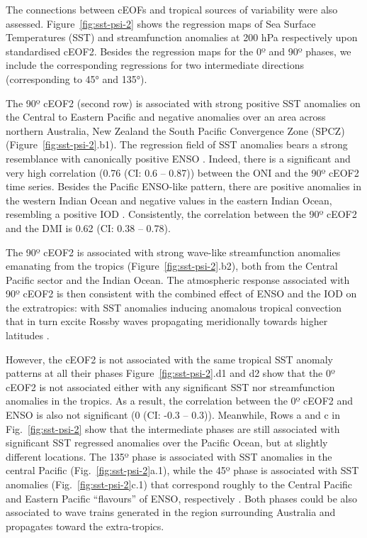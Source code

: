 \documentclass[pdflatex,sn-basic]{sn-jnl}
\theoremstyle{thmstyleone}%
\theoremstyle{thmstyletwo}%
\theoremstyle{thmstylethree}%
\begin{document}
The connections between cEOFs and tropical sources of variability were also assessed.
Figure~\ref{fig:sst-psi-2} shows the regression maps of Sea Surface Temperatures (SST) and streamfunction anomalies at 200 hPa respectively upon standardised cEOF2.
Besides the regression maps for the 0º and 90º phases, we include the corresponding regressions for two intermediate directions (corresponding to 45° and 135°).

The 90º cEOF2 (second row) is associated with strong positive SST anomalies on the Central to Eastern Pacific and negative anomalies over an area across northern Australia, New Zealand the South Pacific Convergence Zone (SPCZ) (Figure~\ref{fig:sst-psi-2}.b1).
The regression field of SST anomalies bears a strong resemblance with canonically positive ENSO \citep{bamston1997}.
Indeed, there is a significant and very high correlation (0.76 (CI: 0.6 -- 0.87)) between the ONI and the 90º cEOF2 time series.
Besides the Pacific ENSO-like pattern, there are positive anomalies in the western Indian Ocean and negative values in the eastern Indian Ocean, resembling a positive IOD \citep{saji1999}.
Consistently, the correlation between the 90º cEOF2 and the DMI is 0.62 (CI: 0.38 -- 0.78).

The 90º cEOF2 is associated with strong wave-like streamfunction anomalies emanating from the tropics (Figure~\ref{fig:sst-psi-2}.b2), both from the Central Pacific sector and the Indian Ocean.
The atmospheric response associated with 90º cEOF2 is then consistent with the combined effect of ENSO and the IOD on the extratropics: with SST anomalies inducing anomalous tropical convection that in turn excite Rossby waves propagating meridionally towards higher latitudes \citep{mo2000, cai2011, nuncio2015}.

However, the cEOF2 is not associated with the same tropical SST anomaly patterns at all their phases
Figure~\ref{fig:sst-psi-2}.d1 and d2 show that the 0º cEOF2 is not associated either with any significant SST nor streamfunction anomalies in the tropics.
As a result, the correlation between the 0º cEOF2 and ENSO is also not significant (0 (CI: -0.3 -- 0.3)).
Meanwhile, Rows a and c in Fig.~\ref{fig:sst-psi-2} show that the intermediate phases are still associated with significant SST regressed anomalies over the Pacific Ocean, but at slightly different locations.
The 135º phase is associated with SST anomalies in the central Pacific (Fig.~\ref{fig:sst-psi-2}a.1), while the 45º phase is associated with SST anomalies (Fig.~\ref{fig:sst-psi-2}c.1) that correspond roughly to the Central Pacific and Eastern Pacific ``flavours'' of ENSO, respectively \citep{kao2009}.
Both phases could be also associated to wave trains generated in the region surrounding Australia and propagates toward the extra-tropics.
\end{document}
